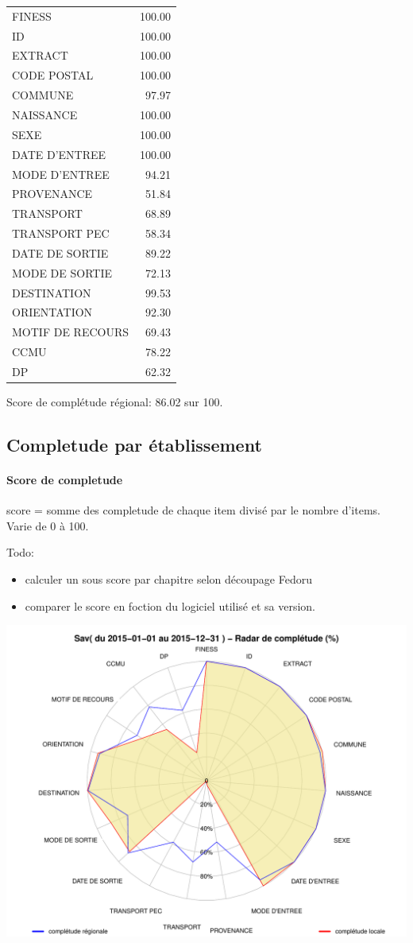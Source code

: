 \documentclass[]{article}
\begin{document}
\begin{longtable}[c]{@{}lr@{}}
\toprule
FINESS & 100.00\tabularnewline
ID & 100.00\tabularnewline
EXTRACT & 100.00\tabularnewline
CODE POSTAL & 100.00\tabularnewline
COMMUNE & 97.97\tabularnewline
NAISSANCE & 100.00\tabularnewline
SEXE & 100.00\tabularnewline
DATE D'ENTREE & 100.00\tabularnewline
MODE D'ENTREE & 94.21\tabularnewline
PROVENANCE & 51.84\tabularnewline
TRANSPORT & 68.89\tabularnewline
TRANSPORT PEC & 58.34\tabularnewline
DATE DE SORTIE & 89.22\tabularnewline
MODE DE SORTIE & 72.13\tabularnewline
DESTINATION & 99.53\tabularnewline
ORIENTATION & 92.30\tabularnewline
MOTIF DE RECOURS & 69.43\tabularnewline
CCMU & 78.22\tabularnewline
DP & 62.32\tabularnewline
\bottomrule
\end{longtable}

Score de complétude régional: 86.02 sur 100.

\subsection{Completude par
établissement}\label{completude-par-etablissement}

\paragraph{Score de completude}\label{score-de-completude}

score = somme des completude de chaque item divisé par le nombre
d'items. Varie de 0 à 100.

Todo:

\begin{itemize}
\itemsep1pt\parskip0pt
\item
  calculer un sous score par chapitre selon découpage Fedoru
\item
  comparer le score en foction du logiciel utilisé et sa version.
\end{itemize}

\includegraphics{completude_files/figure-latex/finess-1.pdf}
\end{document}
